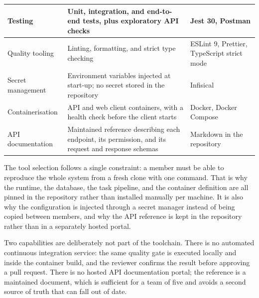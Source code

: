\begin{longtable}{|L{3.1cm}|L{6.3cm}|L{4.9cm}|}
Testing & Unit, integration, and end-to-end tests, plus exploratory API checks & Jest 30, Postman \\ \hline
Quality tooling & Linting, formatting, and strict type checking & ESLint 9, Prettier, TypeScript strict mode \\ \hline
Secret management & Environment variables injected at start-up; no secret stored in the repository & Infisical \\ \hline
Containerisation & API and web client containers, with a health check before the client starts & Docker, Docker Compose \\ \hline
API documentation & Maintained reference describing each endpoint, its permission, and its request and response schemas & Markdown in the repository \\ \hline

\end{longtable}

\endgroup

The tool selection follows a single constraint: a member must be able to reproduce the whole system from a fresh clone with one command. That is why the runtime, the database, the task pipeline, and the container definition are all pinned in the repository rather than installed manually per machine. It is also why the configuration is injected through a secret manager instead of being copied between members, and why the API reference is kept in the repository rather than in a separately hosted portal.

Two capabilities are deliberately not part of the toolchain. There is no automated continuous integration service: the same quality gate is executed locally and inside the container build, and the reviewer confirms the result before approving a pull request. There is no hosted API documentation portal; the reference is a maintained document, which is sufficient for a team of five and avoids a second source of truth that can fall out of date.
